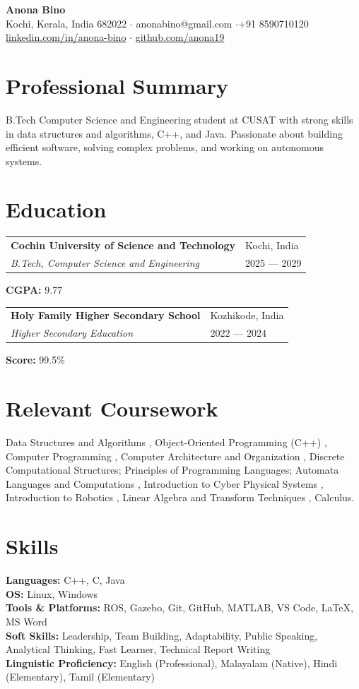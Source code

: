 \documentclass[10pt,a4paper]{extarticle}
\makeatletter
\newcommand{\entry}[4]{%
  \begin{tabularx}{\textwidth}{@{}X>{\raggedleft\arraybackslash}p{4.2cm}@{}}
    \textbf{#1} & \textcolor{muted}{#2}\\[-1pt]
    \textit{#3} & {\textcolor{muted}{#4}}
  \end{tabularx}\vspace{-2pt}
}
\newcommand{\smallgap}{\vspace{2pt}}
\makeatother
\begin{document}
\begin{center}
  {\fontsize{30}{36}\selectfont\bfseries Anona Bino}\\[7pt]
  { Kochi, Kerala, India 682022 \quad$\cdot$\quad
  anonabino@gmail.com
  \quad$\cdot$\quad +91 8590710120}\\[3pt]
  {\href{https://www.linkedin.com/in/anona-bino}{linkedin.com/in/anona-bino}
  \quad$\cdot$\quad
  \href{https://github.com/anona19}{github.com/anona19}}
\end{center}
\vspace{-5pt}

\section{Professional Summary}
B.Tech Computer Science and Engineering student at CUSAT with strong skills in data structures and algorithms, C++, and Java. Passionate about building efficient software, solving complex problems, and working on autonomous systems.


\section{Education}
\entry{Cochin University of Science and Technology}{Kochi, India}{B.Tech, Computer Science and Engineering}{2025 --- 2029}
\hspace{1em}\textbf{CGPA:} 9.77
\smallgap
\smallgap

\entry{Holy Family Higher Secondary School}{Kozhikode, India}{Higher Secondary Education }{2022 --- 2024}
\hspace{1em}\textbf{Score:} 99.5\% 

\section{Relevant Coursework}
\text Data Structures and Algorithms , Object-Oriented Programming (C++) , Computer Programming , Computer Architecture and Organization , Discrete Computational Structures; Principles of Programming Languages; Automata Languages and Computations , Introduction to Cyber Physical Systems , Introduction to Robotics , Linear Algebra and Transform Techniques , Calculus.


\section{Skills}
\textbf{Languages:}  C++, C, Java\\
\textbf{OS:} Linux, Windows\\
\textbf{Tools \& Platforms:} ROS, Gazebo, Git, GitHub, MATLAB, VS Code, LaTeX, MS Word\\
\textbf{Soft Skills:} Leadership, Team Building, Adaptability, Public Speaking, Analytical Thinking, Fast Learner, Technical Report Writing\\
\textbf{Linguistic Proficiency:} English (Professional), Malayalam (Native), Hindi (Elementary), Tamil (Elementary)
\end{document}
